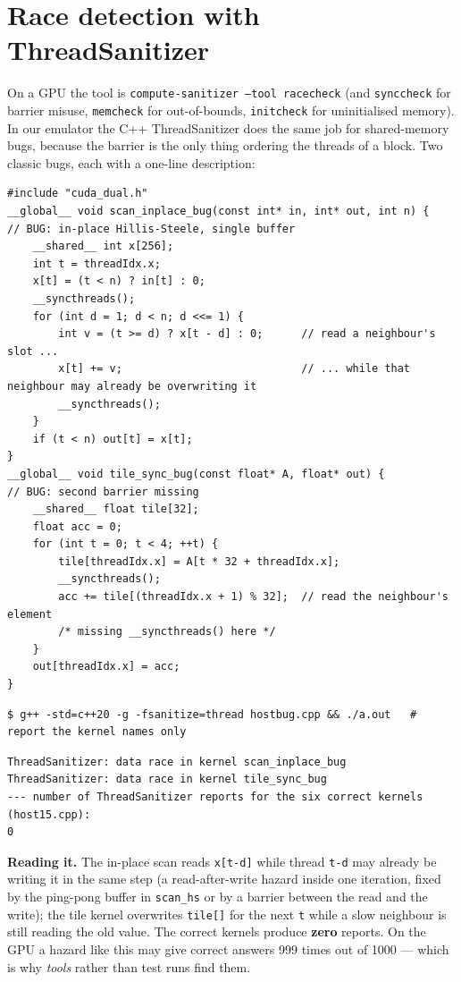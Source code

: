 \documentclass[10pt,a4paper,openany,oneside]{report}
\newcommand{\prio}[1]{\texorpdfstring{\ifcase#1\or{\color{gold}\ding{72}}\or{\color{gold}\ding{72}\ding{72}}\or{\color{gold}\ding{72}\ding{72}\ding{72}}\fi}{}}
\begin{document}
\section{Race detection with ThreadSanitizer \prio{2}}
\label{sec:race}
On a GPU the tool is \texttt{compute-sanitizer --tool racecheck} (and \texttt{synccheck} for barrier misuse, \texttt{memcheck} for out-of-bounds, \texttt{initcheck} for uninitialised memory). In our emulator the C++ ThreadSanitizer does the same job for shared-memory bugs, because the barrier is the only thing ordering the threads of a block. Two classic bugs, each with a one-line description:

\begin{lstlisting}[language={CUDA},basicstyle=\ttfamily\scriptsize,title={kbug.cu: two kernels with a missing barrier}]
#include "cuda_dual.h"
__global__ void scan_inplace_bug(const int* in, int* out, int n) {     // BUG: in-place Hillis-Steele, single buffer
    __shared__ int x[256];
    int t = threadIdx.x;
    x[t] = (t < n) ? in[t] : 0;
    __syncthreads();
    for (int d = 1; d < n; d <<= 1) {
        int v = (t >= d) ? x[t - d] : 0;      // read a neighbour's slot ...
        x[t] += v;                            // ... while that neighbour may already be overwriting it
        __syncthreads();
    }
    if (t < n) out[t] = x[t];
}
__global__ void tile_sync_bug(const float* A, float* out) {            // BUG: second barrier missing
    __shared__ float tile[32];
    float acc = 0;
    for (int t = 0; t < 4; ++t) {
        tile[threadIdx.x] = A[t * 32 + threadIdx.x];
        __syncthreads();
        acc += tile[(threadIdx.x + 1) % 32];  // read the neighbour's element
        /* missing __syncthreads() here */
    }
    out[threadIdx.x] = acc;
}
\end{lstlisting}



\begin{lstlisting}[style=shcmd,basicstyle=\ttfamily\scriptsize]
$ g++ -std=c++20 -g -fsanitize=thread hostbug.cpp && ./a.out   # report the kernel names only
\end{lstlisting}
\begin{lstlisting}[style=out,basicstyle=\ttfamily\scriptsize]
ThreadSanitizer: data race in kernel scan_inplace_bug
ThreadSanitizer: data race in kernel tile_sync_bug
--- number of ThreadSanitizer reports for the six correct kernels (host15.cpp):
0
\end{lstlisting}
\textbf{Reading it.} The in-place scan reads \texttt{x[t-d]} while thread \texttt{t-d} may already be writing it in the same step (a read-after-write hazard inside one iteration, fixed by the ping-pong buffer in \texttt{scan\_hs} or by a barrier between the read and the write); the tile kernel overwrites \texttt{tile[]} for the next \texttt{t} while a slow neighbour is still reading the old value. The correct kernels produce \textbf{zero} reports. On the GPU a hazard like this may give correct answers 999 times out of 1000 --- which is why \emph{tools} rather than test runs find them.
\end{document}
